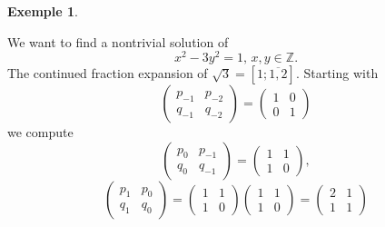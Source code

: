 \documentclass[a4paper,11pt,american]{article}
\newcommand{\Z}{\mathbb{Z}}
\theoremstyle{plain}
\theoremstyle{definition}
\newtheorem{example}{Exemple}
\begin{document}
  \begin{example}
    \label{exe:4}

    We want to find a nontrivial solution of
    \begin{displaymath}
      x^2 - 3 y^2 = 1, \, x,y \in\Z. 
    \end{displaymath}
    The continued fraction expansion of $\sqrt{3} = [1; \overline{1,2}]$.    Starting with
    \begin{displaymath}
      \begin{pmatrix}
        p_{-1} & p_{-2}  \\
        q_{-1} & q_{-2}  
      \end{pmatrix}
      =
      \begin{pmatrix}
        1 & 0 \\
        0 & 1
      \end{pmatrix} 
    \end{displaymath}
    we compute
    \begin{displaymath}
      \begin{pmatrix}
        p_{0} & p_{-1}  \\
        q_{0} & q_{-1}  
      \end{pmatrix} =
      \begin{pmatrix}
        1 & 1  \\
        1 & 0  
      \end{pmatrix},
    \end{displaymath}
 \begin{displaymath}
      \begin{pmatrix}
        p_{1} & p_{0}  \\
        q_{1} & q_{0}  
      \end{pmatrix} =
      \begin{pmatrix}
        1 & 1  \\
        1 & 0  
      \end{pmatrix}
       \begin{pmatrix}
        1 & 1  \\
        1 & 0  
      \end{pmatrix}  =
      \begin{pmatrix}
        2 & 1  \\
        1 & 1  
      \end{pmatrix} 
    \end{displaymath}



\end{example}
\end{document}
